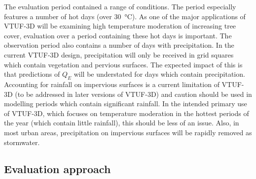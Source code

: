 \documentclass[final,3p,times,authoryear]{elsarticle}
\begin{document}
The evaluation period contained a range of conditions. The period especially features a number of hot days (over \SI{30}{\degreeCelsius}). As one of the major applications of VTUF-3D will be examining high temperature moderation of increasing tree cover, evaluation over a period containing these hot days is important. The observation period also contains a number of days with precipitation. In the current VTUF-3D design, precipitation will only be received in grid squares which contain vegetation and pervious surfaces. The expected impact of this is that predictions of $Q_{E}$ will be understated for days which contain precipitation. Accounting for rainfall on impervious surfaces is a current limitation of VTUF-3D (to be addressed in later versions of VTUF-3D) and caution should be used in modelling periods which contain significant rainfall. In the intended primary use of VTUF-3D, which focuses on temperature moderation in the hottest periods of the year (which contain little rainfall), this should be less of an issue. Also, in most urban areas, precipitation on impervious surfaces will be rapidly removed as stormwater.

\subsection{Evaluation approach}\label{sec:prvalresults}
\end{document}
